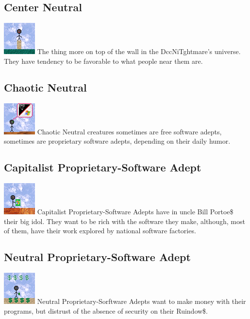 \documentclass[ letterpaper,12pt]{article}
\begin{document}
\subsection{Center Neutral} \includegraphics{../data/alignment/Img/muro.png} The thing more on top of the wall in the DccNiTghtmare's universe.  They have tendency to be favorable to what people near them are.

\subsection{Chaotic Neutral} \includegraphics{../data/alignment/Img/yang.png} Chaotic Neutral creatures sometimes are free software adepts, sometimes are proprietary software adepts, depending on their daily humor.

\subsection{Capitalist Proprietary-Software Adept}\includegraphics{../data/alignment/Img/ruindows.png} Capitalist Proprietary-Software Adepts have in uncle Bill Portoe\$ their big idol. They want to be rich with the software they make, although, most of them, have their work explored by national software factories.

\subsection{Neutral Proprietary-Software Adept} \includegraphics{../data/alignment/Img/cifrao.png} Neutral Proprietary-Sorftware Adepts want to make money with their programs, but distrust of the absence of security on their Ruindow\$.
\end{document}
